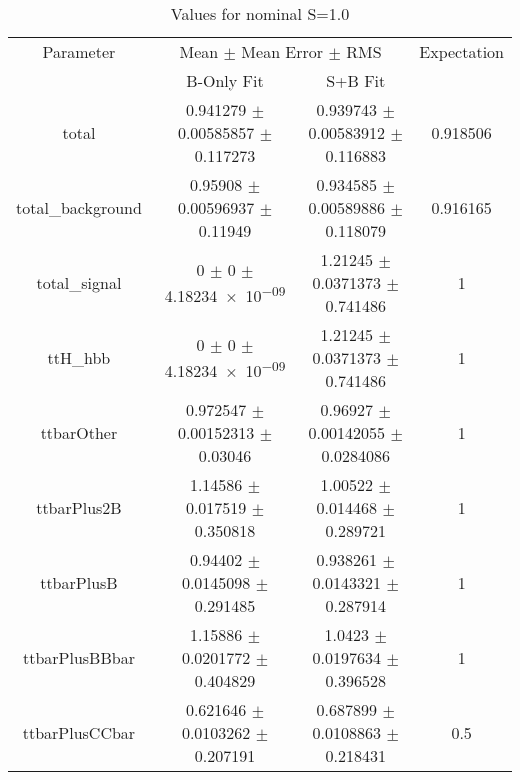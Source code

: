 \begin{table}
\centering
\caption{Values for nominal S=1.0}
\begin{tabular}{cccc}
\toprule
Parameter & \multicolumn{2}{c}{Mean $\pm$ Mean Error $\pm$ RMS} & Expectation\\
 & B-Only Fit & S+B Fit & \\
\midrule
total & \num{0.941279} $\pm$ \num{0.00585857} $\pm$ \num{0.117273} & \num{0.939743} $\pm$ \num{0.00583912} $\pm$ \num{0.116883} & \num{0.918506}\\
total\_background & \num{0.95908} $\pm$ \num{0.00596937} $\pm$ \num{0.11949} & \num{0.934585} $\pm$ \num{0.00589886} $\pm$ \num{0.118079} & \num{0.916165}\\
total\_signal & \num{0} $\pm$ \num{0} $\pm$ \num{4.18234e-09} & \num{1.21245} $\pm$ \num{0.0371373} $\pm$ \num{0.741486} & \num{1}\\
ttH\_hbb & \num{0} $\pm$ \num{0} $\pm$ \num{4.18234e-09} & \num{1.21245} $\pm$ \num{0.0371373} $\pm$ \num{0.741486} & \num{1}\\
ttbarOther & \num{0.972547} $\pm$ \num{0.00152313} $\pm$ \num{0.03046} & \num{0.96927} $\pm$ \num{0.00142055} $\pm$ \num{0.0284086} & \num{1}\\
ttbarPlus2B & \num{1.14586} $\pm$ \num{0.017519} $\pm$ \num{0.350818} & \num{1.00522} $\pm$ \num{0.014468} $\pm$ \num{0.289721} & \num{1}\\
ttbarPlusB & \num{0.94402} $\pm$ \num{0.0145098} $\pm$ \num{0.291485} & \num{0.938261} $\pm$ \num{0.0143321} $\pm$ \num{0.287914} & \num{1}\\
ttbarPlusBBbar & \num{1.15886} $\pm$ \num{0.0201772} $\pm$ \num{0.404829} & \num{1.0423} $\pm$ \num{0.0197634} $\pm$ \num{0.396528} & \num{1}\\
ttbarPlusCCbar & \num{0.621646} $\pm$ \num{0.0103262} $\pm$ \num{0.207191} & \num{0.687899} $\pm$ \num{0.0108863} $\pm$ \num{0.218431} & \num{0.5}\\
\bottomrule
\end{tabular}
\end{table}